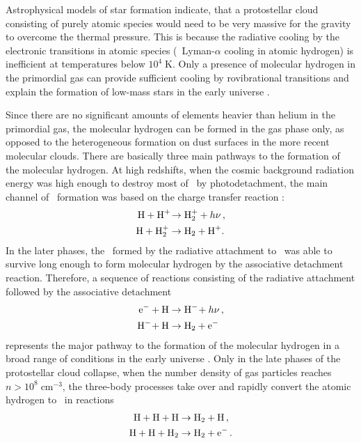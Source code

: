 Astrophysical models of star formation indicate, that a protostellar
cloud consisting of purely atomic species would need to be very massive
for the gravity to overcome the thermal pressure. This is because the
radiative
cooling by the electronic transitions in atomic species (\ie\ Lyman-$\alpha$
cooling in atomic hydrogen) is inefficient at temperatures below $10^4\;\text{K}$.
Only
a presence of molecular hydrogen in the primordial gas can provide sufficient
cooling by rovibrational transitions and explain
the formation of low-mass stars in the early universe \citep{palla1983}.

Since there are no significant amounts of elements heavier than helium in
the primordial gas, the molecular hydrogen can be formed in the gas phase
only, as opposed to the heterogeneous formation on dust surfaces in the more
recent molecular clouds. There are basically three main pathways to the
formation of the molecular hydrogen. At high redshifts, when the cosmic
background radiation energy was high enough to destroy most of \Hminus\ by
photodetachment, the main channel of \Htwo\ formation was based on the
charge transfer reaction \citep{glover2006}:
\begin{align}
    {\ensuremath{\text{H}}} + {\text{H}^+\!} &\to {\ensuremath{\text{H}}}_2^+ + h\nu\,,\\
    {\text{H}} + {\text{H}}_2^+ &\to {\ensuremath{\text{H}}}_2 + {\text{H}^+\!}\,.
\end{align}
In the later phases, the \Hminus\ formed by the radiative attachment to \hydrogen\
was able to survive long enough to form molecular hydrogen by the associative
detachment reaction. Therefore, a sequence of reactions consisting of the radiative
attachment followed by the associative detachment
\begin{align}
    {\ensuremath{\text{e}^-}} + {\text{H}} &\to {\ensuremath{\text{H}^-\!}} + h\nu\,,\\
    {\text{H}^-\!} + {\text{H}} &\to {\ensuremath{\text{H}}}_2 + {\text{e}^-}\,
    \label{eq:intro:AD}
\end{align}
represents the major pathway to the formation of the molecular hydrogen in a
broad range of conditions in the early
universe \citep{glover2006}. Only in the late phases of the protostellar cloud
collapse, when the number density of gas particles reaches
$n>10^8\;\text{cm}^{-3}$, the three-body processes take over and rapidly
convert the atomic hydrogen to \Htwo\ in reactions \citep{palla1983,turk2011}
\begin{align}
    {\ensuremath{\text{H}}} + {\text{H}} + {\text{H}} &\to {\ensuremath{\text{H}_2}} + {\text{H}}\,,\\
    \label{eq:intro:HHH}
    {\ensuremath{\text{H}}} + {\text{H}} + {\text{H}_2} &\to {\ensuremath{\text{H}}}_2 + {\text{e}^-}\,.
\end{align}

